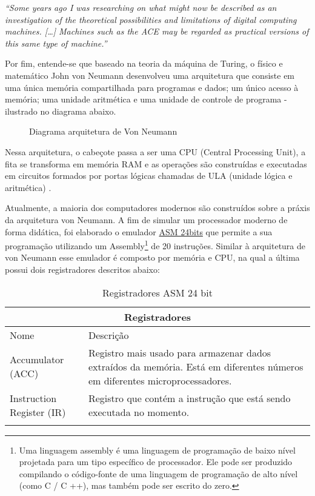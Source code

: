 \textit{
  ``Some years ago I was researching on what might now be described as an investigation of the theoretical possibilities and limitations of digital computing machines. […] Machines such as the ACE may be regarded as practical versions of this same type of machine.'' \cite{11}
}

Por fim, entende-se que baseado na teoria da máquina de Turing, o físico e matemático John von Neumann desenvolveu uma arquitetura que consiste em uma única memória compartilhada para programas e dados; um único acesso à memória; uma unidade aritmética e uma unidade de controle de programa - ilustrado no diagrama abaixo.

\vspace{1cm}
\begin{figure}[H] \centering 
  \caption{\label{von_neumann_architecture} Diagrama arquitetura de Von Neumann} 
\end{figure}

Nessa arquitetura, o cabeçote passa a ser uma CPU (Central Processing Unit), a fita se transforma em memória RAM e as operações são construídas e executadas em circuitos formados por portas lógicas chamadas de ULA (unidade lógica e aritmética) \cite{12}.

Atualmente, a maioria dos computadores modernos são construídos sobre a práxis da arquitetura von Neumann. A fim de simular um processador moderno de forma didática, foi elaborado o emulador \href{https://gzsig.io/vm-24bits/}{ASM 24bits} que permite a sua programação utilizando um Assembly\footnote{Uma linguagem assembly é uma linguagem de programação de baixo nível projetada para um tipo específico de processador. Ele pode ser produzido compilando o código-fonte de uma linguagem de programação de alto nível (como C / C ++), mas também pode ser escrito do zero.} de 20 instruções. Similar à arquitetura de von Neumann esse emulador é composto por memória e CPU, na qual a última possui dois registradores descritos abaixo:

\vspace{1cm}
\begin{longtable}{ |p{3cm}||p{11cm}|  }
  \hline
  \multicolumn{2}{|c|}{Registradores} \\
  \hline
    Nome &
    Descrição\\
  \hline
    Accumulator (ACC) &
    Registro mais usado para armazenar dados extraídos da memória. Está em diferentes números em diferentes microprocessadores. \\
  \hline
    Instruction Register (IR) &
    Registro que contém a instrução que está sendo executada no momento. \\
  \hline
  \caption{Registradores ASM 24 bit}
  \label{registers_asm}
\end{longtable}
\vspace{1cm}


